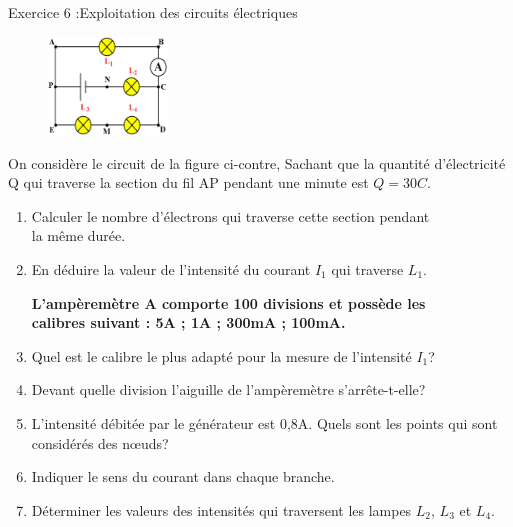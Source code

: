 \documentclass[12pt, french]{article}
\begin{document}
\begin{Box2}{Exercice 6 :Exploitation des circuits électriques}
\begin{figure}
		\vspace{-0.5cm}
  \begin{center}
	\includegraphics[width=0.28\textwidth]{./img/ex06.png}
  \end{center}
\end{figure}

On considère le circuit de la figure ci-contre, Sachant que la
quantité d’électricité Q qui traverse la section du fil AP pendant une
minute est $Q = 30 C$.
\begin{enumerate}
	\item  Calculer le nombre d’électrons qui traverse cette section pendant
\\la même durée.
\item  En déduire la valeur de l’intensité du courant $I_1$ qui traverse $L_1$.
	
\textbf{L’ampèremètre A comporte 100 divisions et possède les \\calibres
suivant : 5A ; 1A ; 300mA ; 100mA.}

\item  Quel est le calibre le plus adapté pour la mesure de l’intensité $I_1$?
\item  Devant quelle division l’aiguille de l’ampèremètre s’arrête-t-elle?
\item  L’intensité débitée par le générateur est 0,8A. Quels sont les points qui sont considérés des nœuds?

\item  Indiquer le sens du courant dans chaque branche.
\item  Déterminer les valeurs des intensités qui traversent les lampes $L_2$, $L_3$ et $L_4$.
\end{enumerate}
\end{Box2}
\end{document}
